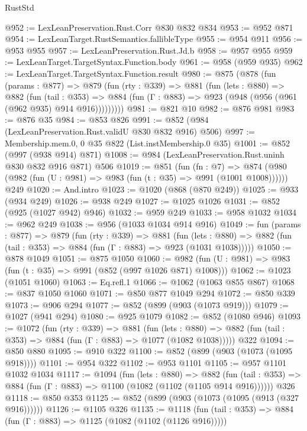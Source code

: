 \begin{lexlean}{RustStd}
\begin{coremodule}
{\begin{coremodule}
{{{{{@952 := LexLeanPreservation.Rust.Corr @830 @832 @834
@953 := @952 @871
@954 := LexLeanTarget.RustSemantics.fallibleType
@955 := @954 @911
@956 := @953 @955
@957 := LexLeanPreservation.Rust.Jd.b
@958 := @957 @955
@959 := LexLeanTarget.TargetSyntax.Function.body
@961 := @958 (@959 @935)
@962 := LexLeanTarget.TargetSyntax.Function.result
@980 := @875
    (@878
      (fun (params : @877) =>
      @879
        (fun (rty : @339) =>
        @881
          (fun (lets : @880) =>
          @882
            (fun (tail : @353) =>
            @884 (fun (Γ : @883) => @923 (@948 (@956 (@961 (@962 @935) @914 @916)))))))))
@981 := @821 @10
@982 := @876 @981
@983 := @876 @35
@984 := @853 @826
@991 := @852 (@984 (LexLeanPreservation.Rust.validU @830 @832 @916) @506)
@997 := Membership.mem.{0, 0} @35 @822 (List.instMembership.{0} @35)
@1001 := @852 (@997 (@938 @914) @871)
@1008 := @984 (LexLeanPreservation.Rust.uninh @830 @832 @916 @871) @506
@1019 := @851
    (fun (fn : @7) =>
    @874 (@980 (@982 (fun (U : @981) => @983 (fun (t : @35) => @991 (@1001 @1008))))))
    @249
@1020 := And.intro
@1023 := @1020 (@868 (@870 @249))
@1025 := @933 (@934 @249)
@1026 := @938 @249
@1027 := @1025 @1026
@1031 := @852 (@925 (@1027 @942) @946)
@1032 := @959 @249
@1033 := @958 @1032
@1034 := @962 @249
@1038 := @956 (@1033 @1034 @914 @916)
@1049 := fun (params : @877) =>
  @879
    (fun (rty : @339) =>
    @881
      (fun (lets : @880) =>
      @882 (fun (tail : @353) => @884 (fun (Γ : @883) => @923 (@1031 @1038)))))
@1050 := @878 @1049
@1051 := @875 @1050
@1060 := @982 (fun (U : @981) => @983 (fun (t : @35) => @991 (@852 (@997 @1026 @871) @1008)))
@1062 := @1023 (@1051 @1060)
@1063 := Eq.refl.{1}
@1066 := @1062 (@1063 @855 @867)
@1068 := @837 @1050 @1060
@1071 := @850 @877 @1049 @294
@1072 := @850 @339
@1073 := @906 @294
@1077 := @852 (@899 (@903 (@1073 @919)))
@1079 := @1027 (@941 @294)
@1080 := @925 @1079
@1082 := @852 (@1080 @946)
@1093 := @1072
    (fun (rty : @339) =>
    @881
      (fun (lets : @880) =>
      @882 (fun (tail : @353) => @884 (fun (Γ : @883) => @1077 (@1082 @1038)))))
    @322
@1094 := @850 @880
@1095 := @910 @322
@1100 := @852 (@899 (@903 (@1073 (@1095 @918))))
@1101 := @954 @322
@1102 := @953 @1101
@1105 := @957 @1101 @1032 @1034
@1117 := @1094
    (fun (lets : @880) =>
    @882 (fun (tail : @353) => @884 (fun (Γ : @883) => @1100 (@1082 (@1102 (@1105 @914 @916))))))
    @326
@1118 := @850 @353
@1125 := @852 (@899 (@903 (@1073 (@1095 (@913 (@327 @916))))))
@1126 := @1105 @326
@1135 := @1118
    (fun (tail : @353) => @884 (fun (Γ : @883) => @1125 (@1082 (@1102 (@1126 @916)))))
}}}}}
\end{coremodule}}
\end{coremodule}
\end{lexlean}
